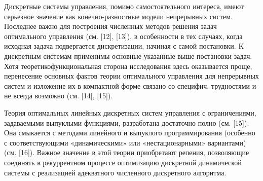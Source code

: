 \documentclass[10pt]{article}
\begin{document}
Дискретные системы управления, помимо самостоятельного интереса, имеют серьезное значение как конечно-разностные модели непрерывных систем. Последнее важно для построения численных методов решения задач оптимального управления (см. [12], [13]), в особенности в тех случаях, когда исходная задача подвергается дискретизации, начиная с самой постановки. $\mathrm{K}$ дискретным системам применимы основные указанные выше постановки задач. Хотя теоретикофункциональная сторона исследования здесь оказывается проще, перенесение основных фактов теории оптимального управления для непрерывных систем и изложение их в компактной форме связано со специфич. трудностями и не всегда возможно (см. [14], [15]).



Теория оптимальных линейных дискретных систем управления с ограничениями, задаваемыми выпуклыми функциями, разработана достаточно полно (см. [15]). Она смыкается с методами линейного и выпуклого программирования (особенно с соответствующими «динамическими» или «нестационарными» вариантами) (см. [16]). Важное значение в этой теории приобретают репения, позволяющие соединять в рекуррентном процессе оптимизацию дискретной динамической системы с реализацией адекватного численного дискретного алгоритма.
\end{document}
